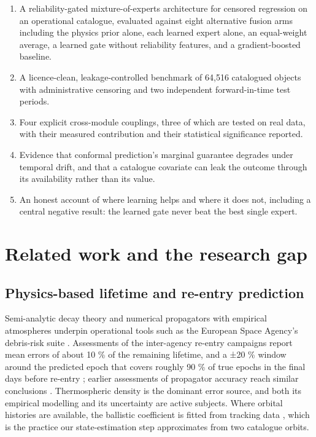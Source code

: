 \documentclass[3p,times,twocolumn]{elsarticle}
\providecommand{\tightlist}{\setlength{\itemsep}{0pt}\setlength{\parskip}{0pt}}
\providecommand{\tightlist}{\setlength{\itemsep}{0pt}\setlength{\parskip}{0pt}}
\begin{document}
\begin{enumerate}
\def\labelenumi{\arabic{enumi}.}
\tightlist
\item
  A reliability-gated mixture-of-experts architecture for censored
  regression on an operational catalogue, evaluated against eight
  alternative fusion arms including the physics prior alone, each
  learned expert alone, an equal-weight average, a learned gate without
  reliability features, and a gradient-boosted baseline.
\item
  A licence-clean, leakage-controlled benchmark of 64,516 catalogued
  objects with administrative censoring and two independent
  forward-in-time test periods.
\item
  Four explicit cross-module couplings, three of which are tested on
  real data, with their measured contribution and their statistical
  significance reported.
\item
  Evidence that conformal prediction's marginal guarantee degrades under
  temporal drift, and that a catalogue covariate can leak the outcome
  through its availability rather than its value.
\item
  An honest account of where learning helps and where it does not,
  including a central negative result: the learned gate never beat the
  best single expert.
\end{enumerate}

\section{Related work and the research gap}\label{sec:related}

\subsection{Physics-based lifetime and re-entry
prediction}\label{physics-based-lifetime-and-re-entry-prediction}

Semi-analytic decay theory
\citep{kinghele1987satellite, frey2019extension} and numerical
propagators with empirical atmospheres underpin operational tools such
as the European Space Agency's debris-risk suite \citep{braun2020drama}.
Assessments of the inter-agency re-entry campaigns report mean errors of
about 10 \% of the remaining lifetime, and a ±20 \% window around the
predicted epoch that covers roughly 90 \% of true epochs in the final
days before re-entry \citep{pardini2018assessing}; earlier assessments
of propagator accuracy reach similar conclusions
\citep{pardini2004accuracy, operti2017assessing}. Thermospheric density
is the dominant error source, and both its empirical modelling
\citep{emmert2021nrlmsis, licata2022msis} and its uncertainty
\citep{licata2022uncertainty, pardini2012thermospheric} are active
subjects. Where orbital histories are available, the ballistic
coefficient is fitted from tracking data
\citep{gondelach2017ballistic, sang2013estimation, pardini2008impact},
which is the practice our state-estimation step approximates from two
catalogue orbits.
\end{document}
